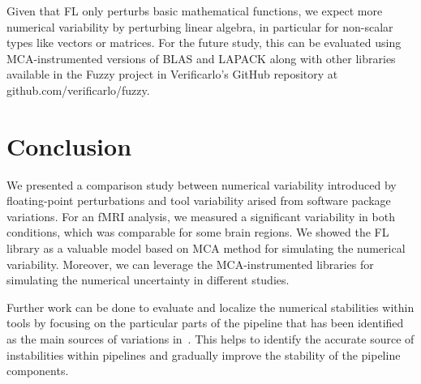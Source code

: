 \documentclass[conference]{IEEEtran}
\begin{document}
Given that FL only perturbs basic mathematical functions, we expect more numerical variability by perturbing linear algebra,
in particular for non-scalar types like vectors or matrices. For the future study, this can be evaluated using MCA-instrumented versions
of BLAS and LAPACK along with other libraries available in the Fuzzy project in Verificarlo's GitHub repository at github.com/verificarlo/fuzzy.


\section{Conclusion}

We presented a comparison study between numerical variability introduced by floating-point perturbations and tool variability arised from software package variations.
For an fMRI analysis, we measured a significant variability in both conditions, which was comparable for some brain regions.
We showed the FL library as a valuable model based on MCA method for simulating the numerical variability.
Moreover, we can leverage the MCA-instrumented libraries for simulating the numerical uncertainty in different studies.

Further work can be done to evaluate and localize the numerical stabilities within tools by focusing on the particular parts of
the pipeline that has been identified as the main sources of variations in~\cite{bowring2021isolating}.
This helps to identify the accurate source of instabilities within pipelines and gradually improve the stability of the pipeline components.



\end{document}
